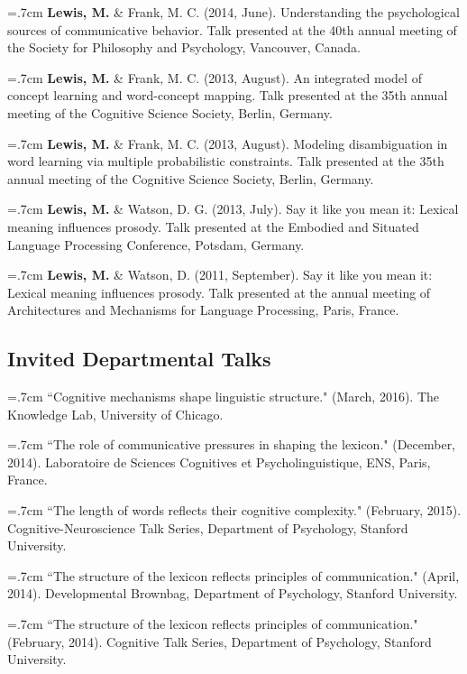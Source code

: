 \documentclass[letterpaper]{article}
\begin{document}
\hangindent=.7cm {\bf Lewis, M.} \& Frank, M. C. (2014, June). Understanding the psychological sources of communicative behavior. Talk presented at the 40th annual meeting of the Society for Philosophy and Psychology, Vancouver, Canada.


 \hangindent=.7cm {\bf Lewis, M.}  \& Frank, M. C. (2013, August). An integrated model of concept learning and word-concept mapping. Talk presented at the 35th annual meeting of the Cognitive Science Society, Berlin, Germany.
 
 \hangindent=.7cm {\bf Lewis, M.}  \& Frank, M. C.  (2013, August). Modeling disambiguation in word learning via multiple probabilistic constraints. Talk presented at the 35th annual meeting of the Cognitive Science Society, Berlin, Germany.
 
  \hangindent=.7cm {\bf Lewis, M.} \& Watson, D. G.  (2013, July). Say it like you mean it: Lexical meaning influences prosody. Talk presented at the Embodied and Situated Language Processing Conference, Potsdam, Germany.
 

 \hangindent=.7cm {\bf Lewis, M.}  \& Watson, D. (2011, September). Say it like you mean it: Lexical meaning influences prosody. Talk presented at the annual meeting of Architectures and Mechanisms for Language Processing, Paris, France.


\subsection*{Invited Departmental Talks}
\hangindent=.7cm  ``Cognitive mechanisms shape linguistic structure."  (March, 2016). The Knowledge Lab, University of Chicago.

\hangindent=.7cm ``The role of communicative pressures in shaping the lexicon." (December, 2014). Laboratoire de Sciences Cognitives et Psycholinguistique, ENS, Paris, France.

\hangindent=.7cm ``The length of words reflects their cognitive complexity." (February, 2015). Cognitive-Neuroscience Talk Series, Department of Psychology, Stanford University.

\hangindent=.7cm ``The structure of the lexicon reflects principles of communication." (April, 2014). Developmental Brownbag, Department of Psychology, Stanford University.

\hangindent=.7cm ``The structure of the lexicon reflects principles of communication." (February, 2014). Cognitive Talk Series, Department of Psychology, Stanford University.
\end{document}
